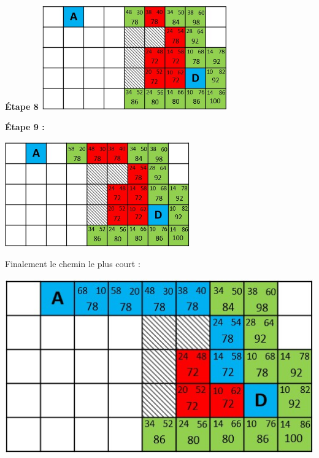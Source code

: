 \begin{multicols}{2}

\begin{center}

\textbf{\'Etape 8}
\includegraphics[width=8cm]{images/quadri10.jpg}
\end{center}



\begin{center}
\textbf{\'Etape 9 :}

\includegraphics[width=8cm]{images/quadri11.jpg}
\end{center}

\end{multicols}
Finalement le chemin le plus court :
\begin{center}
\includegraphics[scale=0.8]{images/quadrifinal.jpg}
\end{center}

